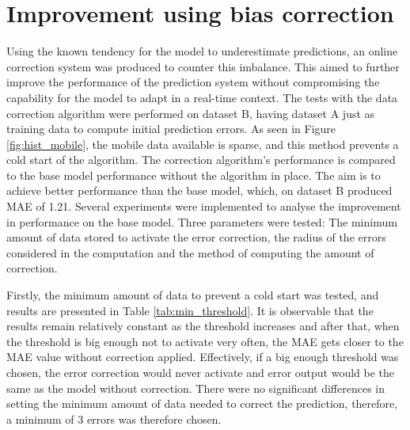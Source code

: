 \section{Improvement using bias correction}
\label{improvement}

Using the known tendency for the model to underestimate predictions, an online correction system was produced to counter this imbalance. This aimed to further improve the performance of the prediction system without compromising the capability for the model to adapt in a real-time context.
The tests with the data correction algorithm were performed on dataset B, having dataset A just as training data to compute initial prediction errors. As seen in Figure \ref{fig:hist_mobile}, the mobile data available is sparse, and this method prevents a cold start of the algorithm. 
The correction algorithm's performance is compared to the base model performance without the algorithm in place. The aim is to achieve better performance than the base model, which, on dataset B produced MAE of 1.21.
Several experiments were implemented to analyse the improvement in performance on the base model. Three parameters were tested: The minimum amount of data stored to activate the error correction, the radius of the errors considered in the computation and the method of computing the amount of correction. 

Firstly, the minimum amount of data to prevent a cold start was tested, and results are presented in Table \ref{tab:min_threshold}. It is observable that the results remain relatively constant as the threshold increases and after that, when the threshold is big enough not to activate very often, the MAE gets closer to the MAE value without correction applied. Effectively, if a big enough threshold was chosen, the error correction would never activate and error output would be the same as the model without correction. There were no significant differences in setting the minimum amount of data needed to correct the prediction, therefore, a minimum of 3 errors was therefore chosen.

\begin{table}[]
\centering
{}
\caption{Minimum activation threshold experiment results}
\label{tab:min_threshold}
\end{table}

